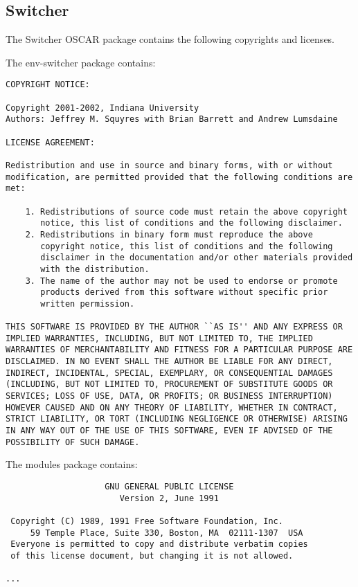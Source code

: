 %
%
%

\subsection{Switcher}
The Switcher OSCAR package contains the following copyrights and licenses.

The env-switcher package contains:

\begin{verbatim}
COPYRIGHT NOTICE:

Copyright 2001-2002, Indiana University
Authors: Jeffrey M. Squyres with Brian Barrett and Andrew Lumsdaine

LICENSE AGREEMENT:

Redistribution and use in source and binary forms, with or without
modification, are permitted provided that the following conditions are
met:

    1. Redistributions of source code must retain the above copyright
       notice, this list of conditions and the following disclaimer.
    2. Redistributions in binary form must reproduce the above
       copyright notice, this list of conditions and the following
       disclaimer in the documentation and/or other materials provided
       with the distribution.
    3. The name of the author may not be used to endorse or promote
       products derived from this software without specific prior
       written permission.

THIS SOFTWARE IS PROVIDED BY THE AUTHOR ``AS IS'' AND ANY EXPRESS OR
IMPLIED WARRANTIES, INCLUDING, BUT NOT LIMITED TO, THE IMPLIED
WARRANTIES OF MERCHANTABILITY AND FITNESS FOR A PARTICULAR PURPOSE ARE
DISCLAIMED. IN NO EVENT SHALL THE AUTHOR BE LIABLE FOR ANY DIRECT,
INDIRECT, INCIDENTAL, SPECIAL, EXEMPLARY, OR CONSEQUENTIAL DAMAGES
(INCLUDING, BUT NOT LIMITED TO, PROCUREMENT OF SUBSTITUTE GOODS OR
SERVICES; LOSS OF USE, DATA, OR PROFITS; OR BUSINESS INTERRUPTION)
HOWEVER CAUSED AND ON ANY THEORY OF LIABILITY, WHETHER IN CONTRACT,
STRICT LIABILITY, OR TORT (INCLUDING NEGLIGENCE OR OTHERWISE) ARISING
IN ANY WAY OUT OF THE USE OF THIS SOFTWARE, EVEN IF ADVISED OF THE
POSSIBILITY OF SUCH DAMAGE.
\end{verbatim}

The modules package contains:

\begin{verbatim}
                    GNU GENERAL PUBLIC LICENSE
                       Version 2, June 1991

 Copyright (C) 1989, 1991 Free Software Foundation, Inc.
     59 Temple Place, Suite 330, Boston, MA  02111-1307  USA
 Everyone is permitted to copy and distribute verbatim copies
 of this license document, but changing it is not allowed.

...
\end{verbatim}

